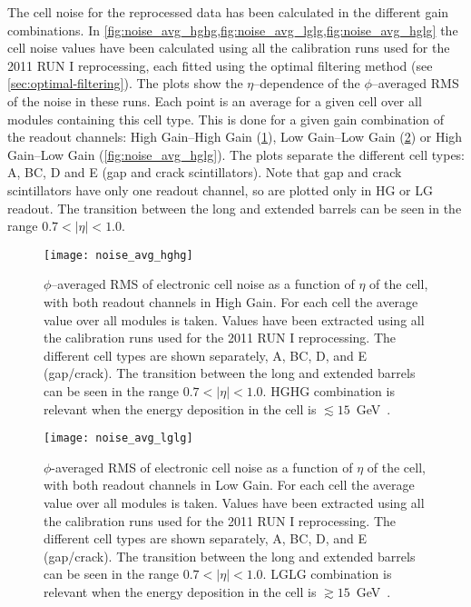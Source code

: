 The cell noise for the reprocessed data has been calculated in the different
gain combinations. In
\cref{fig:noise_avg_hghg,fig:noise_avg_lglg,fig:noise_avg_hglg} the cell noise
values have been calculated using all the calibration runs used for the 2011 RUN
I reprocessing, each fitted using the optimal filtering method (see
\cref{sec:optimal-filtering}). The plots show the $\eta$--dependence of the
$\phi$--averaged RMS of the noise in these runs. Each point is an average for a
given cell over all modules containing this cell type. This is done for a given
gain combination of the readout channels: High Gain--High Gain
(\cref{fig:noise_avg_hghg}), Low Gain--Low Gain (\cref{fig:noise_avg_lglg}) or
High Gain--Low Gain (\cref{fig:noise_avg_hglg}). The plots separate the
different cell types: A, BC, D and E (gap and crack scintillators). Note that
gap and crack scintillators have only one readout channel, so are plotted only
in HG or LG readout. The transition between the long and extended barrels can be
seen in the range $0.7 < |\eta| < 1.0$.


\begin{figure}[!h]
  \centering
    \texttt{[image: noise\_avg\_hghg]}
    \caption{$\phi$--averaged RMS of electronic cell noise as a function of
      $\eta$ of the cell, with both readout channels in High Gain. For each cell
      the average value over all modules is taken. Values have been extracted
      using all the calibration runs used for the 2011 RUN I reprocessing. The
      different cell types are shown separately, A, BC, D, and E
      (gap/crack). The transition between the long and extended barrels can be
      seen in the range $0.7 < |\eta| < 1.0$. HGHG combination is relevant when
      the energy deposition in the cell is
      $\lesssim 15$~GeV~\cite{MyTileCalPlots}.}
    \label{fig:noise_avg_hghg}
\end{figure}

\begin{figure}[!h]
  \centering
    \texttt{[image: noise\_avg\_lglg]}
    \caption{$\phi$-averaged RMS of electronic cell noise as a function of
      $\eta$ of the cell, with both readout channels in Low Gain. For each cell
      the average value over all modules is taken. Values have been extracted
      using all the calibration runs used for the 2011 RUN I reprocessing. The
      different cell types are shown separately, A, BC, D, and E
      (gap/crack). The transition between the long and extended barrels can be
      seen in the range $0.7 < |\eta| < 1.0$. LGLG combination is relevant when
      the energy deposition in the cell is
      $\gtrsim 15$~GeV~\cite{MyTileCalPlots}.}
    \label{fig:noise_avg_lglg}
\end{figure}

